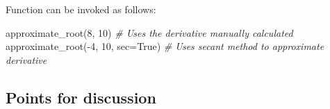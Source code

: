 \documentclass[
]{article}
\newenvironment{Shaded}{}{}
\newcommand{\CommentTok}[1]{\textcolor[rgb]{0.38,0.63,0.69}{\textit{#1}}}
\newcommand{\DecValTok}[1]{\textcolor[rgb]{0.25,0.63,0.44}{#1}}
\newcommand{\NormalTok}[1]{#1}
\newcommand{\OperatorTok}[1]{\textcolor[rgb]{0.40,0.40,0.40}{#1}}
\newcommand{\VariableTok}[1]{\textcolor[rgb]{0.10,0.09,0.49}{#1}}
\begin{document}
Function can be invoked as follows:

\begin{Shaded}
\begin{Highlighting}[]
\NormalTok{approximate\_root(}\DecValTok{8}\NormalTok{, }\DecValTok{10}\NormalTok{) }\CommentTok{\# Uses the derivative manually calculated}
\NormalTok{approximate\_root(}\OperatorTok{{-}}\DecValTok{4}\NormalTok{, }\DecValTok{10}\NormalTok{, sec}\OperatorTok{=}\VariableTok{True}\NormalTok{) }\CommentTok{\# Uses secant method to approximate derivative}
\end{Highlighting}
\end{Shaded}
\newpage
\hypertarget{header-n88}{%
\subsection{Points for discussion}\label{header-n88}}
\end{document}
